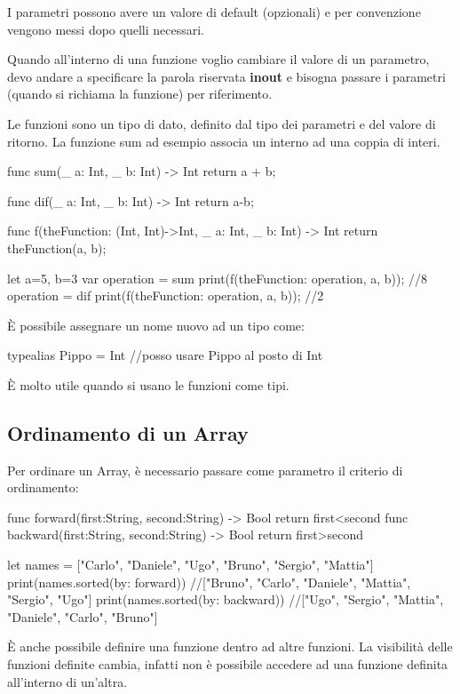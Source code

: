 I parametri possono avere un valore di default (opzionali) e per convenzione vengono messi dopo quelli necessari. 

Quando all'interno di una funzione voglio cambiare il valore di un parametro, devo andare a specificare la parola riservata \textbf{inout} e bisogna passare i parametri (quando si richiama la funzione) per riferimento. 

Le funzioni sono un tipo di dato, definito dal tipo dei parametri e del valore di ritorno. 
La funzione sum ad esempio associa un interno ad una coppia di interi. 
\begin{Swift}
    func sum(_ a: Int, _ b: Int) -> Int{
        return a + b;
    }
    
    func dif(_ a: Int, _ b: Int) -> Int {
        return a-b;
    }
    
    func f(theFunction: (Int, Int)->Int, _ a: 
    Int, _ b: Int) -> Int {
        return theFunction(a, b);
    }
    
    let a=5, b=3
    var operation = sum
    print(f(theFunction: operation, a, b)); //8
    operation = dif
    print(f(theFunction: operation, a, b)); //2
\end{Swift}

È possibile assegnare un nome nuovo ad un tipo come:
\begin{Swift}
    typealias Pippo = Int //posso usare Pippo al posto di Int
\end{Swift}
È molto utile quando si usano le funzioni come tipi.

\subsection{Ordinamento di un Array}
Per ordinare un Array, è necessario passare come parametro il criterio di ordinamento: 
\begin{Swift}
    func forward(first:String, second:String) -> Bool {
        return first<second
    }
    func backward(first:String, second:String) -> Bool {
        return first>second
    }
    
    let names = ["Carlo", "Daniele", "Ugo", "Bruno", "Sergio",
                "Mattia"]
    print(names.sorted(by: forward)) 
    //["Bruno", "Carlo", "Daniele", "Mattia", "Sergio", "Ugo"]
    print(names.sorted(by: backward))
    //["Ugo", "Sergio", "Mattia", "Daniele", "Carlo", "Bruno"]
\end{Swift}

È anche possibile definire una funzione dentro ad altre funzioni. La visibilità delle funzioni definite cambia, infatti non è possibile accedere ad una funzione definita all'interno di un'altra.


